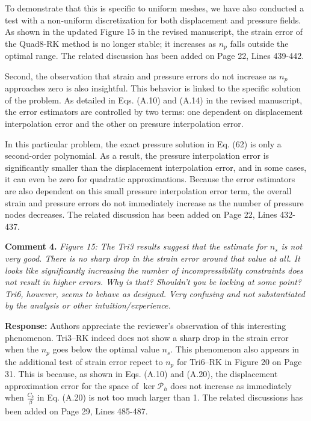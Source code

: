 \documentclass{article}
\begin{document}
To demonstrate that this is specific to uniform meshes, we have also conducted a test with a non-uniform discretization for both displacement and pressure fields.
As shown in the updated Figure 15 in the revised manuscript, the strain error of the Quad8-RK method is no longer stable; it increases as $n_p$ falls outside the optimal range. The related discussion has been added on Page 22, Lines 439-442.

Second, the observation that strain and pressure errors do not increase as $n_p$ approaches zero is also insightful. This behavior is linked to the specific solution of the problem. As detailed in Eqs. (A.10) and (A.14) in the revised manuscript, the error estimators are controlled by two terms: one dependent on displacement interpolation error and the other on pressure interpolation error.

In this particular problem, the exact pressure solution in Eq. (62) is only a second-order polynomial. As a result, the pressure interpolation error is significantly smaller than the displacement interpolation error, and in some cases, it can even be zero for quadratic approximations. Because the error estimators are also dependent on this small pressure interpolation error term, the overall strain and pressure errors do not immediately increase as the number of pressure nodes decreases. The related discussion has been added on Page 22, Lines 432-437.

\textbf{Comment 4.} \textit{
Figure 15:
The Tri3 results suggest that the estimate for $n_s$ is not very good. There is no sharp drop in the strain error around that value at all.
It looks like significantly increasing the number of incompressibility constraints does not result in higher errors.
Why is that? Shouldn't you be locking at some point? Tri6, however, seems to behave as designed. Very confusing and not substantiated by the analysis or other intuition/experience.
}

\textbf{Response:}
Authors appreciate the reviewer's observation of this interesting phenomenon.
Tri3--RK indeed does not show a sharp drop in the strain error when the $n_p$ goes below the optimal value $n_s$.
This phenomenon also appears in the additional test of strain error repect to $n_p$ for Tri6--RK in Figure 20 on Page 31.
This is because, as shown in Eqs. (A.10) and (A.20), the displacement approximation error for the space of $\ker \mathcal P_h$ does not increase as immediately when $\frac{C_b}{\beta}$ in Eq. (A.20) is not too much larger than 1.
The related discussions has been added on Page 29, Lines 485-487.
\end{document}
